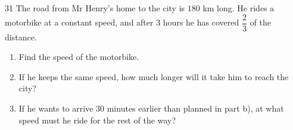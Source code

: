 \providecommand{\rvabBox}[4]{\begin{tikzpicture}[baseline=-0.7ex,font=\small]
  \path (-0.66,-0.42) rectangle (0.66,0.42);
  \draw[Navy,line width=0.8pt,fill=tmBlue!6] (-0.66,-0.32) rectangle (0.66,0.32);
  \draw[Navy,line width=0.8pt] (0,-0.32)--(0,0.32) (-0.66,0)--(0.66,0);
  \node[inner sep=0pt] at (-0.33,0.16){$#1$};\node[inner sep=0pt] at (0.33,0.16){$#2$};
  \node[inner sep=0pt] at (-0.33,-0.16){$#3$};\node[inner sep=0pt] at (0.33,-0.16){$#4$};\end{tikzpicture}}

\clearpage
{}

\begin{probbox}{31}{\relax}
The road from Mr Henry's home to the city is $180$ km long. He rides a motorbike at a constant speed, and after $3$ hours he has covered
$\dfrac{2}{3}$ of the distance.
\begin{enumerate}[label=\alph*),leftmargin=1.6em,itemsep=1pt,topsep=2pt]
\item Find the speed of the motorbike.
\item If he keeps the same speed, how much longer will it take him to reach the city?
\item If he wants to arrive $30$ minutes earlier than planned in part b), at what speed must he ride for the rest of the way?
\end{enumerate}
\end{probbox}
